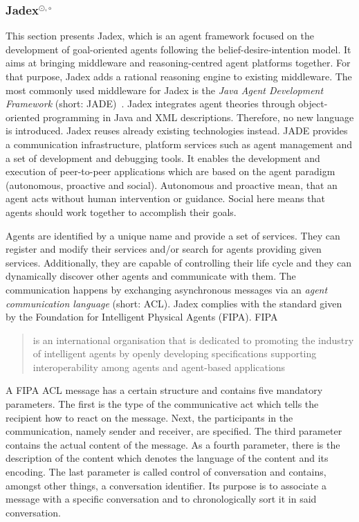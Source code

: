 \subsubsection[Jadex]{Jadex$^{\odot,\circ}$}\label{fun:apl_jadex}
This section presents Jadex, which is an agent framework focused on the development of goal-oriented agents following the belief-desire-intention model.
It aims at bringing middleware and reasoning-centred agent platforms together.
For that purpose, Jadex adds a rational reasoning engine to existing middleware.
The most commonly used middleware for Jadex is the \emph{Java Agent Development Framework} (short: JADE)~\cite{bellifemine_jade_2005}.
Jadex integrates agent theories through object-oriented programming in Java and XML descriptions.
Therefore, no new language is introduced.
Jadex reuses already existing technologies instead.
JADE provides a communication infrastructure, platform services such as agent management and a set of development and debugging tools.
It enables the development and execution of peer-to-peer applications which are based on the agent paradigm (autonomous, proactive and social). %
Autonomous and proactive mean, that an agent acts without human intervention or guidance.
Social here means that agents should work together to accomplish their goals.

Agents are identified by a unique name and provide a set of services.
They can register and modify their services and/or search for agents providing given services.
Additionally, they are capable of controlling their life cycle and they can dynamically discover other agents and communicate with them.
The communication happens by exchanging asynchronous messages via an \emph{agent communication language} (short: ACL).
Jadex complies with the standard given by the Foundation for Intelligent Physical Agents (FIPA).
FIPA \blockquote[\cite{FIPA}][.]{is an international organisation that is dedicated to promoting the industry of intelligent agents by openly developing specifications supporting interoperability among agents and agent-based applications}
A FIPA ACL message has a certain structure and contains five mandatory parameters.
The first is the type of the communicative act which tells the recipient how to react on the message.
Next, the participants in the communication, namely sender and receiver, are specified.
The third parameter contains the actual content of the message.
As a fourth parameter, there is the description of the content which denotes the language of the content and its encoding.
The last parameter is called control of conversation and contains, amongst other things, a conversation identifier.
Its purpose is to associate a message with a specific conversation and to chronologically sort it in said conversation.

